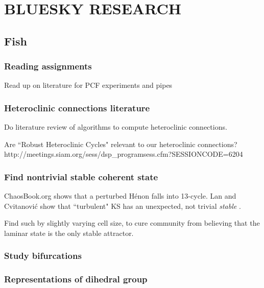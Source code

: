 
\chapter{BLUESKY RESEARCH}
\label{bluesky}

\section{Fish}

\subsection{Reading assignments}

Read up on literature for PCF experiments and pipes

\subsection{Heteroclinic connections literature}

Do literature review of algorithms to
compute heteroclinic connections.

Are ``Robust Heteroclinic Cycles" relevant to our heteroclinic connections?
\\
http://meetings.siam.org/sess/dsp\_programsess.cfm?SESSIONCODE=6204

\subsection{Find nontrivial stable coherent state}

ChaosBook.org shows that a perturbed H\'enon falls into 13-cycle.
Lan and Cvitanovi{\'c} show that ``turbulent" KS has an
unexpected, not trivial {\em stable} \eqv.

Find such by slightly varying cell size,
to cure community from believing that
the laminar state is the only stable attractor.

\subsection{Study bifurcations}

\subsection{Representations of dihedral group}

